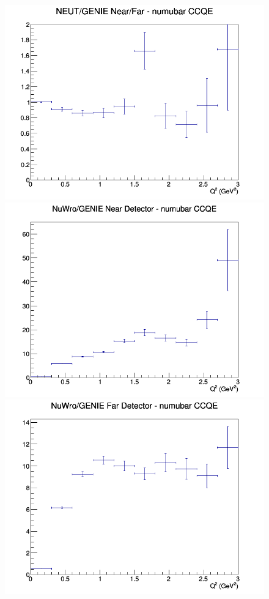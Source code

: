 \begin{figure}[h]
\endminipage
{}
\includegraphics[width=\linewidth]{eff_Q2/GAr/ratios/CCQE_NEUT_GENIE_numubar_NF_Q2.png}
\endminipage
\newline
{}
\includegraphics[width=\linewidth]{eff_Q2/GAr/ratios/CCQE_NuWro_GENIE_numubar_near_Q2.png}
\endminipage
{}
\includegraphics[width=\linewidth]{eff_Q2/GAr/ratios/CCQE_NuWro_GENIE_numubar_far_Q2.png}

\end{figure}

